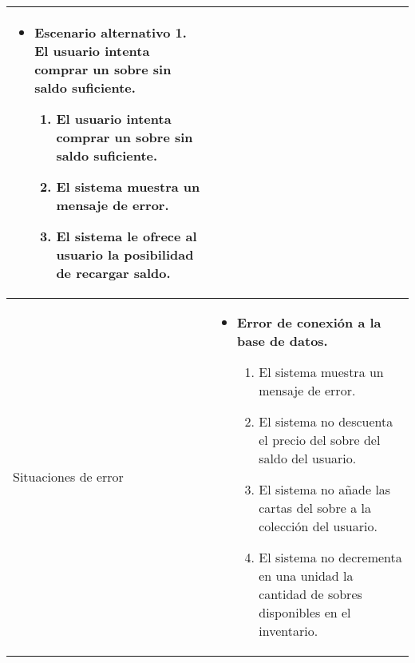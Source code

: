 \begin{longtable}{
    >{\columncolor{lightgreen!20}}p{4cm}
    p{12cm}
    }
\begin{itemize}[nosep,leftmargin=*]
        \item \textbf{Escenario alternativo 1. El usuario intenta comprar un sobre sin saldo suficiente.}
        \begin{enumerate}[nosep,leftmargin=*]
            \item El usuario intenta comprar un sobre sin saldo suficiente.
            \item El sistema muestra un mensaje de error.
            \item El sistema le ofrece al usuario la posibilidad de recargar saldo.
        \end{enumerate}
    \end{itemize} \\
    \midrule
    Situaciones de error & 
    \begin{itemize}[nosep,leftmargin=*]
        \item \textbf{Error de conexión a la base de datos.}
        \begin{enumerate}[nosep,leftmargin=*]
            \item El sistema muestra un mensaje de error.
            \item El sistema no descuenta el precio del sobre del saldo del usuario.
            \item El sistema no añade las cartas del sobre a la colección del usuario.
            \item El sistema no decrementa en una unidad la cantidad de sobres disponibles en el inventario.
        \end{enumerate}
    \end{itemize} \\
\end{longtable}
